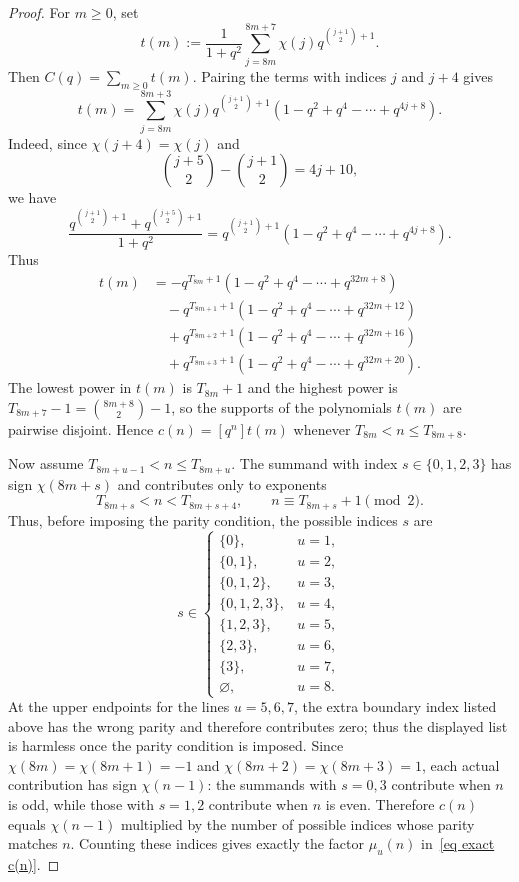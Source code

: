 \documentclass[10pt,a4paper]{amsart}
\numberwithin{equation}{section}
\begin{document}
\begin{proof}
For $m\ge 0$, set
\[
t(m):=\frac{1}{1+q^2}\sum_{j=8m}^{8m+7}\chi(j)q^{\binom{j+1}{2}+1}.
\]
Then $C(q)=\sum_{m\ge 0} t(m)$.  Pairing the terms with indices $j$ and $j+4$ gives
\begin{equation}\label{id lem main-2}
t(m)=\sum_{j=8m}^{8m+3}\chi(j)q^{\binom{j+1}{2}+1}(1-q^2+q^4-\cdots+q^{4j+8}).
\end{equation}
Indeed, since $\chi(j+4)=\chi(j)$ and
\[
\binom{j+5}{2}-\binom{j+1}{2}=4j+10,
\]
we have
\[
\frac{q^{\binom{j+1}{2}+1}+q^{\binom{j+5}{2}+1}}{1+q^2}
=q^{\binom{j+1}{2}+1}(1-q^2+q^4-\cdots+q^{4j+8}).
\]
Thus
\begin{align*}
t(m)
&= -q^{T_{8m}+1}(1-q^2+q^4-\cdots + q^{32m+8}) \\
&\quad -q^{T_{8m+1}+1}(1-q^2+q^4-\cdots + q^{32m+12}) \\
&\quad +q^{T_{8m+2}+1}(1-q^2+q^4-\cdots + q^{32m+16}) \\
&\quad +q^{T_{8m+3}+1}(1-q^2+q^4-\cdots + q^{32m+20}).
\end{align*}
The lowest power in $t(m)$ is $T_{8m}+1$ and the highest power is $T_{8m+7}-1=\binom{8m+8}{2}-1$, so the supports of the polynomials $t(m)$ are pairwise disjoint. Hence $c(n)=[q^n]t(m)$ whenever $T_{8m}<n\le T_{8m+8}$.

Now assume $T_{8m+u-1}<n\le T_{8m+u}$.  The summand with index $s\in\{0,1,2,3\}$ has sign $\chi(8m+s)$ and contributes only to exponents
\[
T_{8m+s}<n<T_{8m+s+4},\qquad
n\equiv T_{8m+s}+1\pmod 2.
\]
Thus, before imposing the parity condition, the possible indices $s$ are
\[
s\in
\begin{cases}
\{0\}, & u=1,\\
\{0,1\}, & u=2,\\
\{0,1,2\}, & u=3,\\
\{0,1,2,3\}, & u=4,\\
\{1,2,3\}, & u=5,\\
\{2,3\}, & u=6,\\
\{3\}, & u=7,\\
\varnothing, & u=8.
\end{cases}
\]
At the upper endpoints for the lines $u=5,6,7$, the extra boundary index listed above has the wrong parity and therefore contributes zero; thus the displayed list is harmless once the parity condition is imposed. Since $\chi(8m)=\chi(8m+1)=-1$ and $\chi(8m+2)=\chi(8m+3)=1$, each actual contribution has sign $\chi(n-1)$: the summands with $s=0,3$ contribute when $n$ is odd, while those with $s=1,2$ contribute when $n$ is even. Therefore $c(n)$ equals $\chi(n-1)$ multiplied by the number of possible indices whose parity matches $n$. Counting these indices gives exactly the factor $\mu_u(n)$ in~\eqref{eq exact c(n)}.
\end{proof}
\end{document}
